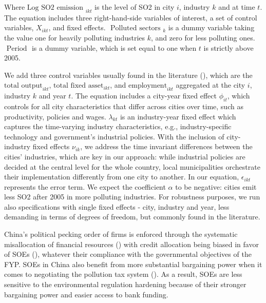 \documentclass[12pt]{article}
\begin{document}
Where $\text {Log SO2 emission }_{i k t}$ is the level of SO2 in city $i$, industry $k$ and at time $t$. The equation includes three right-hand-side variables of interest, a set of control variables, ${X}_{i k t}$, and fixed effects. $\text { Polluted sectors }_{k}$ is a dummy variable taking the value one for heavily polluting industries $k$, and zero for less polluting ones. $\text { Period }$ is a dummy variable, which is set equal to one when $t$ is strictly above 2005. 


We add three control variables usually found in the literature (\citealt{Andersen2016-pa,Andersen2017-wf}), which are the $\text{total output}_{ikt}$, $\text{total fixed asset}_{ikt}$, and $\text{employment}_{ikt}$ aggregated at the city $i$, industry $k$ and year $t$. The equation includes a city-year fixed effect $\phi_{it}$, which controls for all city characteristics that differ across cities over time, such as productivity, policies and wages. $\lambda_{kt}$ is an industry-year fixed effect which captures the time-varying industry characteristics, e.g., industry-specific technology and government's industrial policies. With the inclusion of city-industry fixed effects $\nu_{ik}$, we address the time invariant differences between the cities' industries, which are key in our approach: while industrial policies are decided at the central level for the whole country, local municipalities orchestrate their implementation differently from one city to another. In our equation, $\epsilon_{ikt}$ represents the error term. We expect the coefficient $\alpha$ to be negative: cities emit less SO2 after 2005 in more polluting industries. For robustness purposes, we run also specifications with single fixed effects - city, industry and year, less demanding in terms of degrees of freedom, but commonly found in the literature. 


China's political pecking order of firms is enforced through the systematic misallocation of financial resources (\citealt{Dollar2007-dr}) with credit allocation being biased in favor of SOEs (\citealt{Brandt2003-hu,Ferri2009-lh,Hale2011-ma,Huang2003-oa}), whatever their compliance with the governmental objectives of the FYP. SOEs in China also benefit from more substantial bargaining power when it comes to negotiating the pollution tax system (\citealt{Wang2003-ar,Wang2005-yy}). As a result, SOEs are less sensitive to the environmental regulation hardening because of their stronger bargaining power and easier access to bank funding. 
\end{document}
